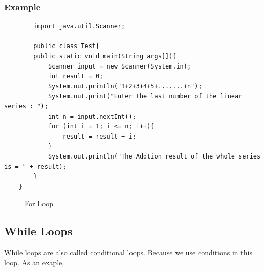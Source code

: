 \documentclass[A4 paper,openany]{book}  %
\begin{document}
\subsubsection{Example}
\begin{center}
    \footnotesize
    \begin{verbatim}
        import java.util.Scanner;

        public class Test{
        public static void main(String args[]){
            Scanner input = new Scanner(System.in);
            int result = 0;
            System.out.println("1+2+3+4+5+.......+n");
            System.out.print("Enter the last number of the linear series : ");
            int n = input.nextInt();
            for (int i = 1; i <= n; i++){
                result = result + i;
            }
            System.out.println("The Addtion result of the whole series is = " + result);
        }
    }
    \end{verbatim}
\end{center}
% 
% 
\begin{figure}[htbp]
    \begin{center}
        \caption{For Loop\cite{Ref3}}
    \end{center}
\end{figure}
% 
% 
\subsection{While Loops}
While loops are also called conditional loops. Because we use conditions in this loop. As an exaple,
\end{document}
